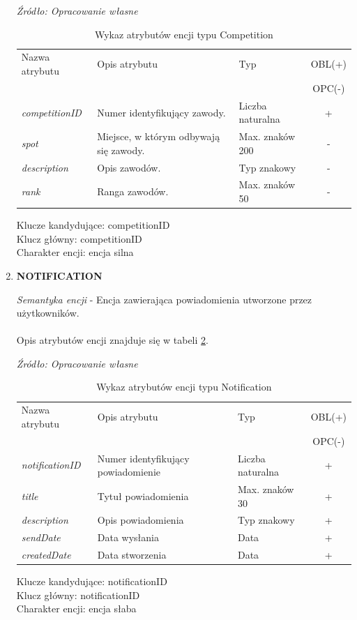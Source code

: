 \documentclass[12pt,twoside]{report}
\begin{document}
\begin{enumerate}[start=1,label={\bfseries ENC\textbackslash0\arabic*}]
	\begin{table}[H]
	    \caption{Wykaz atrybutów encji typu Competition}
	    \textit{Źródło: Opracowanie własne}
	    \label{competitionAtribute}
		\centering
		\begin{tabular}{|l|l|l|c|}
			\hline
			Nazwa atrybutu & Opis atrybutu & Typ & OBL(+) \\
			& & &  OPC(-) \\
			\hline
			\textit{competitionID} & Numer identyfikujący zawody. & Liczba naturalna & + \\
			\hline
			\textit{spot} & Miejsce, w którym odbywają się zawody. & Max. znaków 200 & - \\
			\hline
			\textit{description} & Opis zawodów. & Typ znakowy & - \\
			\hline
			\textit{rank} & Ranga zawodów. &  Max. znaków 50 & - \\
			\hline
		\end{tabular}
	\end{table}
	Klucze kandydujące: competitionID \\
	Klucz główny: competitionID \\
	Charakter encji: encja silna \\
	\item \textbf{NOTIFICATION}
	
	\textit{Semantyka encji} - Encja zawierająca powiadomienia utworzone przez użytkowników.
\\ \\
Opis atrybutów encji znajduje się w tabeli \ref{NotificationAtribute}.

	\begin{table}[H]
		\caption{Wykaz atrybutów encji typu Notification }
		\textit{Źródło: Opracowanie własne}
		\label{NotificationAtribute}
		\centering
		\begin{tabular}{|l|l|l|c|}
			\hline
			Nazwa atrybutu & Opis atrybutu & Typ & OBL(+) \\
			& & &  OPC(-) \\
			\hline
			\textit{notificationID} & Numer identyfikujący powiadomienie& Liczba naturalna & + \\
			\hline
			\textit{title} &  Tytuł powiadomienia & Max. znaków 30 & + \\
			\hline
			\textit{description} & Opis powiadomienia & Typ znakowy & + \\
			\hline
			\textit{sendDate} &  Data wysłania & Data & + \\
			\hline
			\textit{createdDate} &  Data stworzenia & Data & + \\
			\hline
		\end{tabular}
	\end{table}
	Klucze kandydujące: notificationID \\
	Klucz główny: notificationID \\
	Charakter encji: encja słaba \\
	

\end{enumerate}
\end{document}
